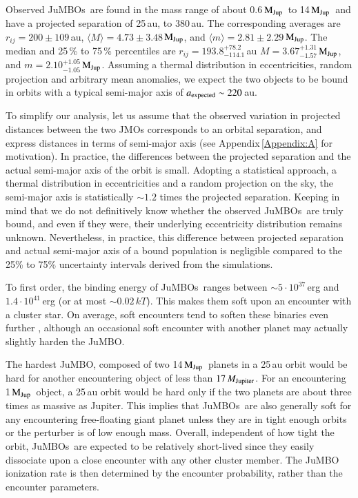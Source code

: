 \documentclass[submission,phys]{lib/SciPost}
\newcommand{\MJup}{\mbox{$\mathrm{{M}}_{\rm Jup}$}}
\newcommand{\jumbo}{\mbox{JuMBO}}
\newcommand{\jumbos}{\mbox{JuMBOs}}
\begin{document}
Observed \jumbos\ are found in the mass range of about 0.6\,\MJup\, to
14\,\MJup\, and have a projected separation of 25\,au, to $380$\,au.
The corresponding averages are $r_{ij}=200\pm109$\,au, $\langle
M\rangle = 4.73\pm3.48$\,\MJup, and $\langle m\rangle =
2.81\pm2.29$\,\MJup. The median and 25\,\% to 75\,\% percentiles are
$r_{ij} = 193.8^{+78.2}_{-114.1}$\,au $M =
3.67^{+1.31}_{-1.57}$\,\MJup, and $m = 2.10^{+1.05}_{-1.05}$\,\MJup.
Assuming a thermal distribution in eccentricities, random projection
and arbitrary mean anomalies, we expect the two objects to be bound in
orbits with a typical semi-major axis of $a_{\rm expected} \sim
220$\,au.

To simplify our analysis, let us assume that the observed variation in
projected distances between the two JMOs corresponds to an orbital
separation, and express distances in terms of semi-major axis (see
Appendix\,\ref{Appendix:A} for motivation).  In practice, the
differences between the projected separation and the actual semi-major
axis of the orbit is small. Adopting a statistical approach, a thermal
distribution in eccentricities and a random projection on the sky, the
semi-major axis is statistically $\sim 1.2$ times the projected
separation. Keeping in mind that we do not definitively know whether
the observed \jumbos\, are truly bound, and even if they were, their
underlying eccentricity distribution remains unknown. Nevertheless, in
practice, this difference between projected separation and actual
semi-major axis of a bound population is negligible compared to the
25\% to 75\% uncertainty intervals derived from the simulations.

To first order, the binding energy of \jumbos\ ranges between $\sim
5\cdot 10^{37}$\,erg and $1.4\cdot 10^{41}$\,erg (or at most $\sim
0.02$\,$kT$). This makes them soft upon an encounter with a cluster star. 
On average, soft encounters tend to soften these binaries even further
\cite{1975MNRAS.173..729H}, although an occasional soft encounter with
another planet may actually slightly harden the \jumbo. 

The hardest \jumbo, composed of two 14\,\MJup\, planets in a 25\,au
orbit would be hard for another encountering object of less than
$17\,M_{\rm Jupiter}$.  For an encountering 1\,\MJup\, object, a 25\,au
orbit would be hard only if the two planets are about three times as
massive as Jupiter.  This implies that \jumbos\, are also generally soft for
any encountering free-floating giant planet unless they are in tight
enough orbits or the perturber is of low enough mass. Overall, independent
of how tight the orbit, \jumbos\, are expected to be relatively short-lived
since they easily dissociate upon a close encounter with any
other cluster member.  The \jumbo\, ionization rate is then determined
by the encounter probability, rather than the encounter parameters.
\end{document}
